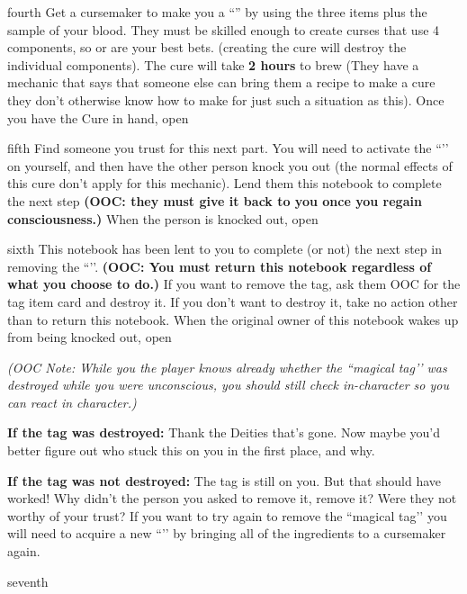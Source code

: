 \documentclass[notebook]{GL2020} %
\begin{document}
\begin{page}{fourth}
Get a cursemaker to make you a ``\iPanacea{}'' by using the three items plus the sample of your blood. They must be skilled enough to create curses that use 4 components, so \cPrince{} or \cCurse{} are your best bets. (creating the cure will destroy the individual components). The cure will take \textbf{2 hours} to brew (They have a mechanic that says that someone else can bring them a recipe to make a cure they don’t otherwise know how to make for just such a situation as this). Once you have the Cure in hand, open 
\end{page}

\begin{page}{fifth}
Find someone you trust for this next part. You will need to activate the ``\iPanacea{}’’ on yourself, and then have the other person knock you out (the normal effects of this cure don't apply for this mechanic).  Lend them this notebook to complete the next step \textbf{(OOC: they must give it back to you once you regain consciousness.)} When the person is knocked out, open 
\end{page}

\begin{page}{sixth}
This notebook has been lent to you to complete (or not) the next step in removing the ``\iMagicTag{}’’. \textbf{(OOC: You must return this notebook regardless of what you choose to do.)} If you want to remove the tag, ask them OOC for the tag item card and destroy it. If you don’t want to destroy it, take no action other than to return this notebook. When the original owner of this notebook wakes up from being knocked out, open 
\end{page}
\emph{(OOC Note: While you the player knows already whether the ``magical tag’’ was destroyed while you were unconscious, you should still check in-character so you can react in character.)}

\textbf{If the tag was destroyed:} Thank the Deities that’s gone. Now maybe you’d better figure out who stuck this on you in the first place, and why.

\textbf{If the tag was not destroyed:} The tag is still on you. But that should have worked! Why didn’t the person you asked to remove it, remove it? Were they not worthy of your trust? If you want to try again to remove the ``magical tag’’ you will need to acquire a new ``\iPanacea{}’’ by bringing all of the ingredients to a cursemaker again.

\begin{page}{seventh}

\end{page}

\endnotebook
\end{document}
